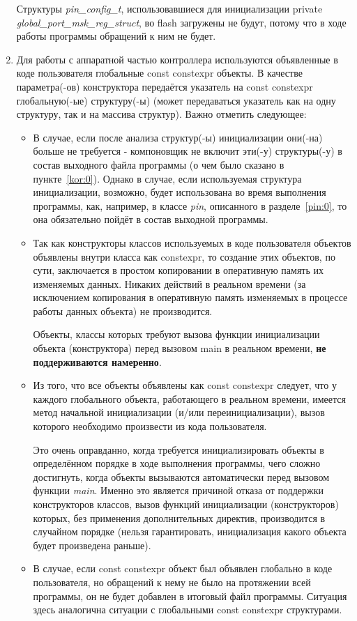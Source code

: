 \begin{enumerate}
	Структуры \textit{pin\_\-config\_\-t}, использовавшиеся для инициализации private \textit{global\_\-port\_\-msk\_\-reg\_\-struct}, во flash загружены не будут, потому что в ходе работы программы обращений к ним не будет.
	\label{kor:0}
	\item Для работы с аппаратной частью контроллера используются объявленные в коде пользователя глобальные const constexpr объекты. В качестве параметра(-ов) конструктора передаётся указатель на const constexpr глобальную(-ые) структуру(-ы) (может передаваться указатель как на одну структуру, так и на массива структур). Важно отметить следующее:
	\begin{itemize}
		\item В случае, если после анализа структур(-ы) инициализации они(-на) больше не требуется - компоновщик не включит эти(-у) структуры(-у) в состав выходного файла программы (о чем было сказано в пункте~\ref{kor:0}). Однако в случае, если используемая структура инициализации, возможно, будет использована во время выполнения программы, как, например, в классе \textit{pin}, описанного в разделе~\ref{pin:0}, то она обязательно пойдёт в состав выходной программы.
		\item Так как конструкторы классов используемых в коде пользователя объектов объявлены внутри класса как constexpr, то создание этих объектов, по сути, заключается в простом копировании в оперативную память их изменяемых данных. Никаких действий в реальном времени (за исключением копирования в оперативную память изменяемых в процессе работы данных объекта) не производится.
		
		Объекты, классы которых требуют вызова функции инициализации  объекта (конструктора) перед вызовом main в реальном времени, \textbf{не поддерживаются намеренно}.
		\item Из того, что все объекты объявлены как const constexpr следует, что у каждого глобального объекта, работающего в реальном времени, имеется метод начальной инициализации (и/или переинициализации), вызов которого необходимо произвести из кода пользователя. 
		
		Это очень оправданно, когда требуется инициализировать объекты в определённом порядке в ходе выполнения программы, чего сложно достигнуть, когда объекты вызываются автоматически перед вызовом функции \textit{main}. Именно это является причиной отказа от поддержки конструкторов классов, вызов функций инициализации (конструкторов) которых, без применения дополнительных директив, производится в случайном порядке (нельзя гарантировать, инициализация какого объекта будет произведена раньше).
		
		\item В случае, если const constexpr объект был объявлен глобально в коде пользователя, но обращений к нему не было на протяжении всей программы, он не будет добавлен в итоговый файл программы. Ситуация здесь аналогична ситуации с глобальными const constexpr структурами.
	\end{itemize}
\end{enumerate}


\label{gp:0}				%
\label{pin:0}				%
